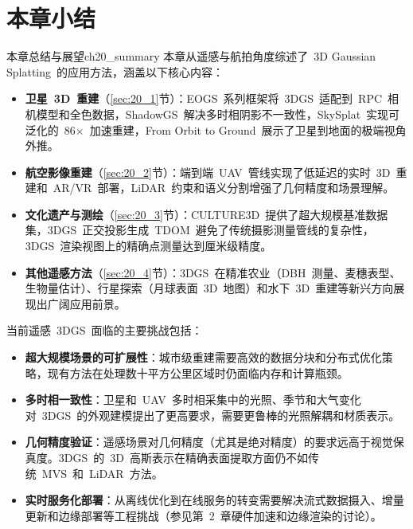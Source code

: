 

\section*{本章小结}

\begin{futurebox}{本章总结与展望}{ch20_summary}
本章从遥感与航拍角度综述了~3D Gaussian Splatting~的应用方法，涵盖以下核心内容：
\begin{itemize}
\item \textbf{卫星~3D~重建}（\ref{sec:20_1}节）：EOGS~系列框架将~3DGS~适配到~RPC~相机模型和全色数据，ShadowGS~解决多时相阴影不一致性，SkySplat~实现可泛化的~86$\times$~加速重建，From Orbit to Ground~展示了卫星到地面的极端视角外推。
\item \textbf{航空影像重建}（\ref{sec:20_2}节）：端到端~UAV~管线实现了低延迟的实时~3D~重建和~AR/VR~部署，LiDAR~约束和语义分割增强了几何精度和场景理解。
\item \textbf{文化遗产与测绘}（\ref{sec:20_3}节）：CULTURE3D~提供了超大规模基准数据集，3DGS~正交投影生成~TDOM~避免了传统摄影测量管线的复杂性，3DGS~渲染视图上的精确点测量达到厘米级精度。
\item \textbf{其他遥感方法}（\ref{sec:20_4}节）：3DGS~在精准农业（DBH~测量、麦穗表型、生物量估计）、行星探索（月球表面~3D~地图）和水下~3D~重建等新兴方向展现出广阔应用前景。
\end{itemize}

当前遥感~3DGS~面临的主要挑战包括：
\begin{itemize}
\item \textbf{超大规模场景的可扩展性}：城市级重建需要高效的数据分块和分布式优化策略，现有方法在处理数十平方公里区域时仍面临内存和计算瓶颈。
\item \textbf{多时相一致性}：卫星和~UAV~多时相采集中的光照、季节和大气变化对~3DGS~的外观建模提出了更高要求，需要更鲁棒的光照解耦和材质表示。
\item \textbf{几何精度验证}：遥感场景对几何精度（尤其是绝对精度）的要求远高于视觉保真度。3DGS~的~3D~高斯表示在精确表面提取方面仍不如传统~MVS~和~LiDAR~方法。
\item \textbf{实时服务化部署}：从离线优化到在线服务的转变需要解决流式数据摄入、增量更新和边缘部署等工程挑战（参见第~2~章硬件加速和边缘渲染的讨论）。
\end{itemize}
\end{futurebox}

